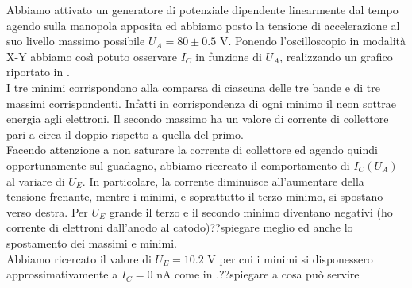 Abbiamo attivato un generatore di potenziale dipendente linearmente dal tempo agendo sulla manopola apposita ed abbiamo posto la tensione di accelerazione al suo livello massimo possibile $U_A = 80 \pm 0.5$ V. Ponendo l'oscilloscopio in modalità X-Y abbiamo così potuto osservare $I_C$ in funzione di $U_A$, realizzando un grafico riportato in . \\
I tre minimi corrispondono alla comparsa di ciascuna delle tre bande e di tre massimi corrispondenti. Infatti in corrispondenza di ogni minimo il neon sottrae energia agli elettroni. Il secondo massimo ha un valore di corrente di collettore pari a circa il doppio rispetto a quella del primo.\\
Facendo attenzione a non saturare la corrente di collettore ed agendo quindi opportunamente sul guadagno, abbiamo ricercato il comportamento di $I_C(U_A)$ al variare di $U_E$. In particolare, la corrente diminuisce all'aumentare della tensione frenante, mentre i minimi, e soprattutto il terzo minimo, si spostano verso destra. Per $U_E$ grande il terzo e il secondo minimo diventano negativi (ho corrente di elettroni dall'anodo al catodo)??spiegare meglio ed anche lo spostamento dei massimi e minimi.\\
Abbiamo ricercato il valore di $U_E = 10.2$ V per cui i minimi si disponessero approssimativamente a $I_C = 0$ nA come in .??spiegare a cosa può servire\\
